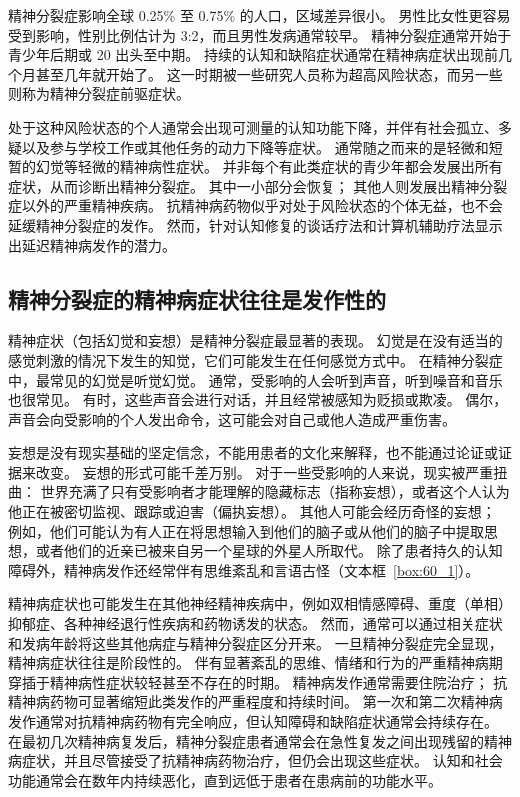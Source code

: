 精神分裂症影响全球 0.25\% 至 0.75\% 的人口，区域差异很小。
男性比女性更容易受到影响，性别比例估计为 3:2，而且男性发病通常较早。
精神分裂症通常开始于青少年后期或 20 出头至中期。
持续的认知和缺陷症状通常在精神病症状出现前几个月甚至几年就开始了。
这一时期被一些研究人员称为超高风险状态，而另一些则称为精神分裂症前驱症状。


处于这种风险状态的个人通常会出现可测量的认知功能下降，并伴有社会孤立、多疑以及参与学校工作或其他任务的动力下降等症状。
通常随之而来的是轻微和短暂的幻觉等轻微的精神病性症状。
并非每个有此类症状的青少年都会发展出所有症状，从而诊断出精神分裂症。
其中一小部分会恢复；
其他人则发展出精神分裂症以外的严重精神疾病。
抗精神病药物似乎对处于风险状态的个体无益，也不会延缓精神分裂症的发作。
然而，针对认知修复的谈话疗法和计算机辅助疗法显示出延迟精神病发作的潜力。



\subsection{精神分裂症的精神病症状往往是发作性的}

精神症状（包括幻觉和妄想）是精神分裂症最显著的表现。
幻觉是在没有适当的感觉刺激的情况下发生的知觉，它们可能发生在任何感觉方式中。
在精神分裂症中，最常见的幻觉是听觉幻觉。
通常，受影响的人会听到声音，听到噪音和音乐也很常见。
有时，这些声音会进行对话，并且经常被感知为贬损或欺凌。
偶尔，声音会向受影响的个人发出命令，这可能会对自己或他人造成严重伤害。


妄想是没有现实基础的坚定信念，不能用患者的文化来解释，也不能通过论证或证据来改变。
妄想的形式可能千差万别。
对于一些受影响的人来说，现实被严重扭曲：
世界充满了只有受影响者才能理解的隐藏标志（指称妄想），或者这个人认为他正在被密切监视、跟踪或迫害（偏执妄想）。
其他人可能会经历奇怪的妄想；
例如，他们可能认为有人正在将思想输入到他们的脑子或从他们的脑子中提取思想，或者他们的近亲已被来自另一个星球的外星人所取代。
除了患者持久的认知障碍外，精神病发作还经常伴有思维紊乱和言语古怪（文本框~\ref{box:60_1}）。


精神病症状也可能发生在其他神经精神疾病中，例如双相情感障碍、重度（单相）抑郁症、各种神经退行性疾病和药物诱发的状态。
然而，通常可以通过相关症状和发病年龄将这些其他病症与精神分裂症区分开来。
一旦精神分裂症完全显现，精神病症状往往是阶段性的。
伴有显著紊乱的思维、情绪和行为的严重精神病期穿插于精神病性症状较轻甚至不存在的时期。
精神病发作通常需要住院治疗；
抗精神病药物可显著缩短此类发作的严重程度和持续时间。
第一次和第二次精神病发作通常对抗精神病药物有完全响应，但认知障碍和缺陷症状通常会持续存在。
在最初几次精神病复发后，精神分裂症患者通常会在急性复发之间出现残留的精神病症状，并且尽管接受了抗精神病药物治疗，但仍会出现这些症状。
认知和社会功能通常会在数年内持续恶化，直到远低于患者在患病前的功能水平。



